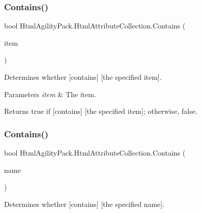 \subsubsection{\texorpdfstring{Contains()}{Contains()}\hspace{0.1cm}{\footnotesize\ttfamily [1/2]}}
{\footnotesize\ttfamily bool Html\+Agility\+Pack.\+Html\+Attribute\+Collection.\+Contains (\begin{DoxyParamCaption}\item[{\hyperlink{class_html_agility_pack_1_1_html_attribute}{Html\+Attribute}}]{item }\end{DoxyParamCaption})\hspace{0.3cm}{\ttfamily [inline]}}



Determines whether \mbox{[}contains\mbox{]} \mbox{[}the specified item\mbox{]}. 


\begin{DoxyParams}{Parameters}
{\em item} & The item.\\
\hline
\end{DoxyParams}
\begin{DoxyReturn}{Returns}
{\ttfamily true} if \mbox{[}contains\mbox{]} \mbox{[}the specified item\mbox{]}; otherwise, {\ttfamily false}.
\end{DoxyReturn}
\mbox{\label{class_html_agility_pack_1_1_html_attribute_collection_ad6085d0d48d215fa7215e9ea97fcd16d}} 
\subsubsection{\texorpdfstring{Contains()}{Contains()}\hspace{0.1cm}{\footnotesize\ttfamily [2/2]}}
{\footnotesize\ttfamily bool Html\+Agility\+Pack.\+Html\+Attribute\+Collection.\+Contains (\begin{DoxyParamCaption}\item[{string}]{name }\end{DoxyParamCaption})\hspace{0.3cm}{\ttfamily [inline]}}



Determines whether \mbox{[}contains\mbox{]} \mbox{[}the specified name\mbox{]}. 


